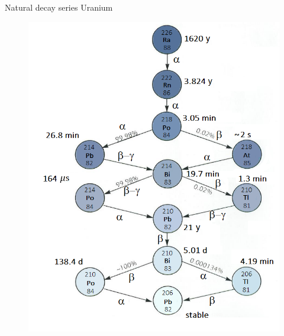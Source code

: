 \begin{frame}{Natural decay series Uranium}

\begin{figure}
\centering
\includegraphics[scale=0.35]{figures/CadenaRn222.png}
\end{figure}


\end{frame}



